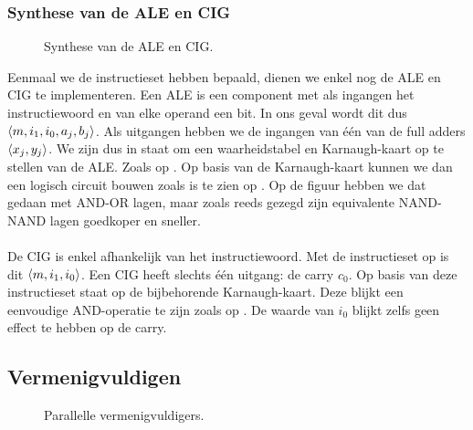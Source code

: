 \subsubsection{Synthese van de ALE en CIG}

\begin{figure}[hbt]
\centering
{}
\caption{Synthese van de ALE en CIG.}
\end{figure}

Eenmaal we de instructieset hebben bepaald, dienen we enkel nog de ALE en CIG te implementeren. Een ALE is een component met als ingangen het instructiewoord en van elke operand een bit. In ons geval wordt dit dus $\left\langle m,i_1,i_0,a_j,b_j \right\rangle$. Als uitgangen hebben we de ingangen van \'e\'en van de full adders $\left\langle x_j,y_j \right\rangle$. We zijn dus in staat om een waarheidstabel en Karnaugh-kaart op te stellen van de ALE. Zoals op . Op basis van de Karnaugh-kaart kunnen we dan een logisch circuit bouwen zoals is te zien op . Op de figuur hebben we dat gedaan met AND-OR lagen, maar zoals reeds gezegd zijn equivalente NAND-NAND lagen goedkoper en sneller.

\paragraph{}
De CIG is enkel afhankelijk van het instructiewoord. Met de instructieset op  is dit $\left\langle m,i_1,i_0 \right\rangle$. Een CIG heeft slechts \'e\'en uitgang: de carry $c_0$. Op basis van deze instructieset staat op  de bijbehorende Karnaugh-kaart. Deze blijkt een eenvoudige AND-operatie te zijn zoals op . De waarde van $i_0$ blijkt zelfs geen effect te hebben op de carry.

\subsection{Vermenigvuldigen}

\begin{figure}[ht!b]
\centering
{}
\caption{Parallelle vermenigvuldigers.}
\end{figure}

